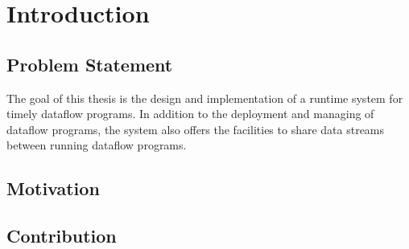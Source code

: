 \chapter{Introduction}\label{ch:introduction}

\section{Problem Statement}

The goal of this thesis is the design and implementation of a runtime system
for timely dataflow programs. In addition to the deployment and managing of
dataflow programs, the system also offers the facilities to share data streams
between running dataflow programs.


\section{Motivation}

\section{Contribution}
